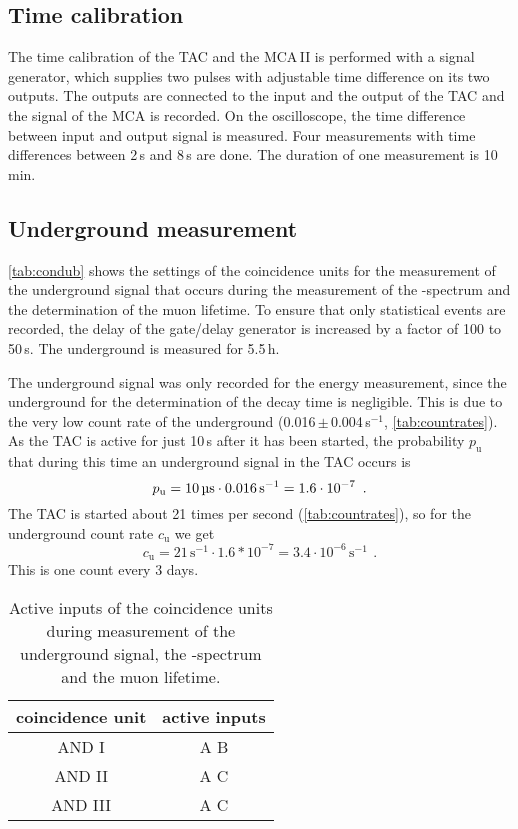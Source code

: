 \subsection{Time calibration}
The time calibration of the TAC and the MCA\,II is performed
with a signal generator,
which supplies two pulses with adjustable time difference on its two outputs.
The outputs are connected to the input and the output of the TAC and the signal
of the MCA is recorded.
On the oscilloscope, the time difference between input and output signal is measured.
Four measurements with time differences between 2\,\textmu s and 8\,\textmu s are done.
The duration of one measurement is 10\,min.


\subsection{Underground measurement}
\autoref{tab:condub} shows the settings of the coincidence units for the measurement of the underground
signal that occurs during the measurement of the \textbeta-spectrum and the determination of the muon lifetime.
To ensure that only statistical events are recorded, the delay of the gate/delay generator is increased by 
a factor of 100 to 50\,\textmu s. The underground is measured for 5.5\,h.

The underground signal was only recorded for the energy measurement,
since the underground for the determination of the decay time is negligible.
This is due to the very low count rate of the underground (0.016\,$\pm$\,0.004\,s$^{-1}$, \autoref{tab:countrates}).
As the TAC is active for just 10\,\textmu s after it has been started, the probability $p_\text{u}$
that during this time an underground signal in the TAC occurs is
\begin{equation}
    p_\text{u}=10\,\text{\textmu s} \cdot 0.016\,\text{s}^{-1}=1.6 \cdot 10^{-7} \ \, .
\end{equation}
The TAC is started about 21 times per second (\autoref{tab:countrates}),
so for the underground count rate $c_\text{u}$ we get
\begin{equation}
    c_\text{u}=21\,\text{s}^{-1}\cdot1.6*10^{-7}=3.4\cdot10^{-6}\,\text{s}^{-1} \ \, .
\end{equation}
This is one count every 3 days.

\begin{table}[H]
\caption{Active inputs of the coincidence units during measurement of the underground signal,
the \textbeta-spectrum and the muon lifetime.}
\begin{center}
\begin{tabular}{|c|c|}
  \hline
  coincidence unit	& active inputs	\\ \hline\hline
  AND I				& A B			\\ \hline
  AND II			& A	C			\\ \hline
  AND III			& A C			\\ \hline
 \end{tabular}
\end{center}
\label{tab:condub}
\end{table}

